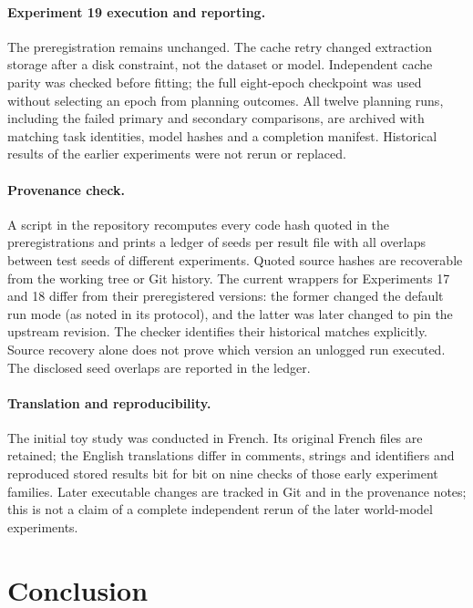 \documentclass[11pt,a4paper]{article}
\begin{document}
\paragraph{Experiment 19 execution and reporting.} The preregistration remains unchanged. The cache retry changed extraction storage after a disk constraint, not the dataset or model. Independent cache parity was checked before fitting; the full eight-epoch checkpoint was used without selecting an epoch from planning outcomes. All twelve planning runs, including the failed primary and secondary comparisons, are archived with matching task identities, model hashes and a completion manifest. Historical results of the earlier experiments were not rerun or replaced.

\paragraph{Provenance check.} A script in the repository recomputes every code hash quoted in the preregistrations and prints a ledger of seeds per result file with all overlaps between test seeds of different experiments. Quoted source hashes are recoverable from the working tree or Git history. The current wrappers for Experiments 17 and 18 differ from their preregistered versions: the former changed the default run mode (as noted in its protocol), and the latter was later changed to pin the upstream revision. The checker identifies their historical matches explicitly. Source recovery alone does not prove which version an unlogged run executed. The disclosed seed overlaps are reported in the ledger.

\paragraph{Translation and reproducibility.} The initial toy study was conducted in French. Its original French files are retained; the English translations differ in comments, strings and identifiers and reproduced stored results bit for bit on nine checks of those early experiment families. Later executable changes are tracked in Git and in the provenance notes; this is not a claim of a complete independent rerun of the later world-model experiments.

\section{Conclusion}
\end{document}
